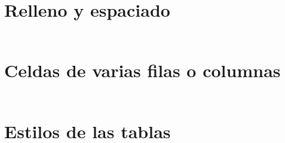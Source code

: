 \begin{frame}[c]{}
\end{frame}

\begin{frame}[fragile]
  \frametitle{}

  \vspace{\baselineskip}
  \begin{lstlisting}

  \end{lstlisting}
\end{frame}

\section{Relleno y espaciado}

\begin{frame}[c]{}
\end{frame}

\begin{frame}[fragile]
  \frametitle{}

  \vspace{\baselineskip}
  \begin{lstlisting}

  \end{lstlisting}
\end{frame}

\section{Celdas de varias filas o columnas}

\begin{frame}[c]{}
\end{frame}

\begin{frame}[fragile]
  \frametitle{}

  \vspace{\baselineskip}
  \begin{lstlisting}

  \end{lstlisting}
\end{frame}

\section{Estilos de las tablas}

\begin{frame}[c]{}
\end{frame}

